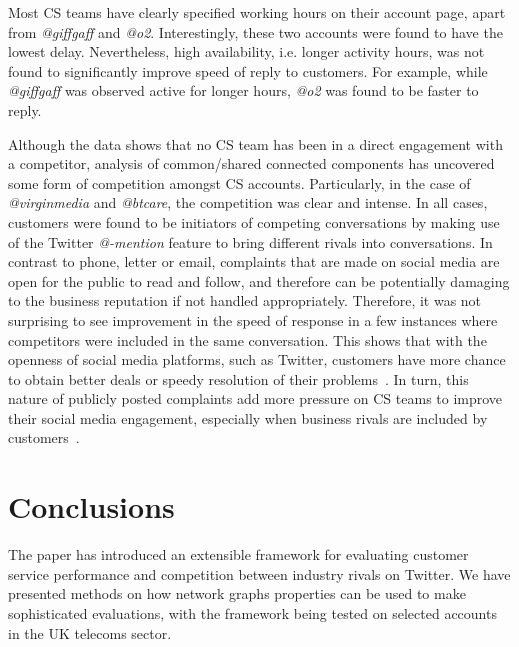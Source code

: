 \documentclass[sigconf]{acmart}
\begin{document}
Most CS teams have clearly specified working hours on their account
page, apart from {\emph{@giffgaff}} and {\emph{@o2}}. Interestingly,
these two accounts were found to have the lowest delay. Nevertheless,
high availability, i.e. longer activity hours, was not found to
significantly improve speed of reply to customers. For example, while
{\emph{@giffgaff}} was observed active for longer hours, {\emph{@o2}}
was found to be faster to reply.

Although the data shows that no CS team has been in a direct
engagement with a competitor, analysis of common/shared connected
components has uncovered some form of competition amongst CS
accounts. Particularly, in the case of {\emph{@virginmedia}} and
{\emph{@btcare}}, the competition was clear and intense. In all cases,
customers were found to be initiators of competing conversations by
making use of the Twitter {\emph{@-mention}} feature to bring
different rivals into conversations. In contrast to phone, letter or
email, complaints that are made on social media are open for the
public to read and follow, and therefore can be potentially damaging
to the business reputation if not handled appropriately. Therefore, it
was not surprising to see improvement in the speed of response in a
few instances where competitors were included in the same
conversation. This shows that with the openness of social media
platforms, such as Twitter, customers have more chance to obtain
better deals or speedy resolution of their
problems~\cite{einwiller+steilen:2015}. In turn, this nature of
publicly posted complaints add more pressure on CS teams to improve
their social media engagement, especially when business rivals are
included by customers~\cite{gregoire-et-al:2015}.

\section{Conclusions}\label{conclusions}

The paper has introduced an extensible framework for evaluating
customer service performance and competition between industry rivals
on Twitter. We have presented methods on how network graphs properties
can be used to make sophisticated evaluations, with the framework
being tested on selected accounts in the UK telecoms sector.
\end{document}
